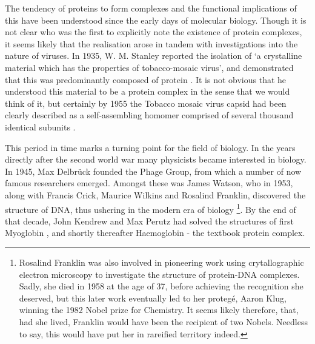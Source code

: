 \documentclass[a4paper,11pt,twoside,openright]{scrbook}
\let\cite\supercite
\begin{document}

The tendency of proteins to form complexes and the functional implications of this have been understood since the early days of molecular biology. Though it is not clear who was the first to explicitly note the existence of protein complexes, it seems likely that the realisation arose in tandem with investigations into the nature of viruses. In 1935, W. M. Stanley reported the isolation of `a crystalline material which has the properties of tobacco-mosaic virus', and demonstrated that this was predominantly composed of protein \cite{Stanley1935}. It is not obvious that he understood this material to be a protein complex in the sense that we would think of it, but certainly by 1955 the Tobacco mosaic virus capsid had been clearly described as a self-assembling homomer comprised of several thousand identical subunits \cite{Fraenkel-Conrat1955}.

This period in time marks a turning point for the field of biology. In the years directly after the second world war many physicists became interested in biology. In 1945, Max Delbr{\"u}ck founded the Phage Group, from which a number of now famous researchers emerged. Amongst these was James Watson, who in 1953, along with Francis Crick, Maurice Wilkins and Rosalind Franklin, discovered the structure of DNA, thus ushering in the modern era of biology \footnote{ Rosalind Franklin was also involved in pioneering work using crytallographic electron microscopy to investigate the structure of protein-DNA complexes. Sadly, she died in 1958 at the age of 37, before achieving the recognition she deserved, but this later work eventually led to her proteg{\'e},  Aaron Klug, winning the 1982 Nobel prize for Chemistry. It seems likely therefore, that, had she lived, Franklin would have been the recipient of two Nobels. Needless to say, this would have put her in rareified territory indeed.}.
By the end of that decade, John Kendrew and Max Perutz had solved the structures of first Myoglobin \cite{Kendrew1958}, and shortly thereafter Haemoglobin \cite{Perutz1960} - the textbook protein complex.
\end{document}
